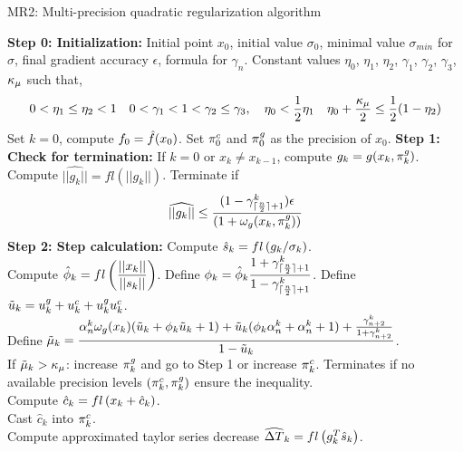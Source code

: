 \documentclass{article}[12pt]
\DeclarePairedDelimiter{\ceil}{\lceil}{\rceil}
\begin{document}
		\begin{algorithm}
			\caption{MR2: Multi-precision quadratic regularization algorithm}
			\label{alg:qrmp}
			
			\begin{algorithmic}
				\State \textbf{Step 0: Initialization:} Initial point $x_0$, initial value $\sigma_0$, minimal value $\sigma_{min}$ for $\sigma$, final gradient accuracy $\epsilon$, formula for $\gamma_n$. Constant values $\eta_0$, $\eta_1$, $\eta_2$, $\gamma_1$, $\gamma_2$, $\gamma_3$, $\kappa_\mu$ such that,
				\begin{equation}
					\label{eq:param_cond_mp}
					0<\eta_1\leq \eta_2<1\quad 0<\gamma_1<1<  \gamma_2 \leq \gamma_3, \quad \eta_0<\frac{1}{2}\eta_1 \quad \eta_0+\dfrac{\kappa_\mu}{2} \leq \frac{1}{2}(1-\eta_2)
				\end{equation}
				Set $k=0$, compute $f_0 = \hat{f}(x_0)$. Set $\pi_{0}^c$ and $\pi_{0}^g$ as the precision of $x_0$.
				\State \textbf{Step 1: Check for termination:} If $k = 0$ or $x_k \neq x_{k-1}$, compute $g_k = g(x_k,\pi_{k}^g)$. Compute $\widehat{||g_k||} = fl(||g_k||)$. Terminate if \begin{equation}
					\label{eq:stop_crit_mp}
					\widehat{||g_k||} \leq \dfrac{(1-\gamma_{\ceil{\frac{n}{2}}+1}^k)\epsilon}{(1+\eg(x_k,\gpreck{k}))}
				\end{equation}
				\State \textbf{Step 2: Step calculation: } Compute $\hat{s}_{k} = fl\left(g_k/\sigma_k\right)$.\\
				Compute $\hat{\phi}_k = fl\left(\dfrac{||x_k||}{||s_k||}\right)$. 
				Define $\phi_k = \hat{\phi}_k\dfrac{1+\gamma_{\ceil{\frac{n}{2}}+1}^k}{1-\gamma_{\ceil{\frac{n}{2}}+1}^k}$. Define $\tilde{u}_{k} = u_k^g + u_k^c + u_k^g u_k^c$.\\
				Define $\tilde{\mu}_k = \dfrac{\alpha_n^k \omega_g(x_k)(\tilde{u}_{k}+\phi_k \tilde{u}_{k}+1) + \tilde{u}_{k}(\phi_k\alpha_n^k+\alpha_n^k+1) + \frac{\gamma_{n+2}^k}{1+\gamma_{n+2}^k}}{1-\tilde{u}_{k}}$.\\ If $ \tilde{\mu}_k > \kappa_\mu$: increase $\pi_{k}^g$ and go to Step 1 or increase $\pi_{k}^c$. Terminates if no available precision levels $(\pi_{k}^c,\pi_{k}^g)$ ensure the inequality.\\
				Compute $\hat{c}_k = fl\left(x_k+\hat{c}_k\right)$.\\
				Cast $\hat{c}_k$ into $\pi_{k}^c$.\\
				Compute approximated taylor series decrease $\widehat{\Delta T}_k = fl\left(g_k^T\hat{s}_{k}\right)$.\\
				

\end{algorithmic}
\end{algorithm}
\end{document}
